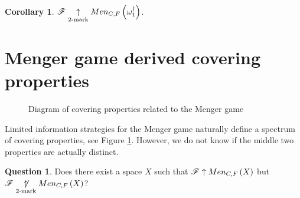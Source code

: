 \documentclass{amsart}
\newtheorem{corollary}[theorem]{Corollary}
\theoremstyle{definition}
\newtheorem{question}[theorem]{Question}
\begin{document}
\begin{corollary}
  \(\mathscr{F} \underset{2\text{-mark}}{\uparrow}Men_{C,F}\left({\omega^\dagger_1}\right)\).
\end{corollary}



\section{Menger game derived covering properties}

\begin{figure}[h]
\begin{center}

\end{center}
\caption{Diagram of covering properties related to the Menger game}
\label{menSpec}
\end{figure}

Limited information strategies for the Menger game naturally define a spectrum
of covering properties, see Figure \ref{menSpec}. However,
we do not know if the middle two properties are actually distinct.

\begin{question}\label{perfectTo2Mark}
  Does there exist a space \(X\) such that \(\mathscr{F} \uparrow Men_{C,F}\left({X}\right)\) but
  \(\mathscr{F} \underset{2\text{-mark}}{\not\uparrow} Men_{C,F}\left({X}\right)\)?
\end{question}
\end{document}
